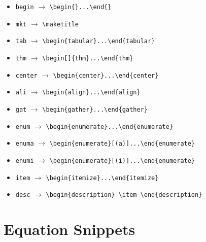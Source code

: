 \documentclass[a4paper,11pt]{article}
\begin{document}
\begin{itemize}
	\item \verb|begin| $\rightarrow$ \verb|\begin{}...\end{}|
	\item \verb|mkt| $\rightarrow$ \verb|\maketitle|
	\item \verb|tab| $\rightarrow$ \verb|\begin{tabular}...\end{tabular}|
	\item \verb|thm| $\rightarrow$ \verb|\begin[]{thm}...\end{thm}|
	\item \verb|center| $\rightarrow$ \verb|\begin{center}...\end{center}|
	\item \verb|ali| $\rightarrow$ \verb|\begin{align}...\end{align}|
	\item \verb|gat| $\rightarrow$ \verb|\begin{gather}...\end{gather}|
	\item \verb|enum| $\rightarrow$ \verb|\begin{enumerate}...\end{enumerate}|
	\item \verb|enuma| $\rightarrow$ \verb|\begin{enumerate}[(a)]...\end{enumerate}|
	\item \verb|enumi|  $\rightarrow$ \verb|\begin{enumerate}[(i)]...\end{enumerate}|
	\item \verb|item| $\rightarrow$ \verb|\begin{itemize}...\end{itemize}|
	\item \verb|desc| $\rightarrow$ \verb|\begin{description} \item \end{description}|
\end{itemize}

\section{Equation Snippets}
\end{document}
